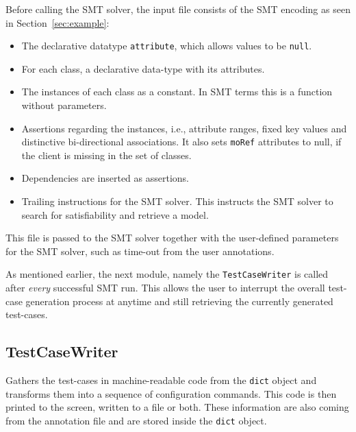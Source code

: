 Before calling the SMT solver, the input file consists of the SMT encoding as seen in Section~\ref{sec:example}:
\begin{itemize}
 \item The declarative datatype \verb|attribute|, which allows values to be \verb|null|.
 
 \item For each class, a declarative data-type with its attributes.
 
 \item The instances of each class as a constant. In SMT terms this is a function without parameters. 
 
 \item Assertions regarding the instances, i.e., attribute ranges, fixed key values and distinctive bi-directional associations. It also sets \verb|moRef| attributes to null, if the client is missing in the set of classes.
 
 \item Dependencies are inserted as assertions.
 
 \item Trailing instructions for the SMT solver. This instructs the SMT solver to search for satisfiability and retrieve a model. 
\end{itemize}

This file is passed to the SMT solver together with the user-defined parameters for the SMT solver, such as time-out from the user annotations.

As mentioned earlier, the next module, namely the \verb|TestCaseWriter| is called after \emph{every} successful SMT run. This allows the user to interrupt the overall test-case generation process at anytime and still retrieving the currently generated test-cases.


\subsection*{TestCaseWriter}

Gathers the test-cases in machine-readable code from the \verb|dict| object and transforms them into a sequence of configuration commands. This code is then printed to the screen, written to a file or both. These information are also coming from the annotation file and are stored inside the \verb|dict| object. 